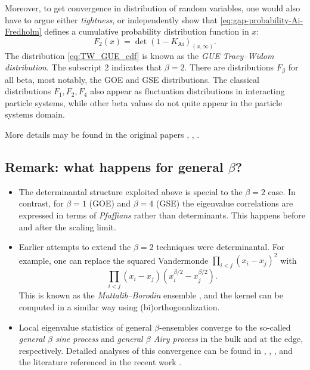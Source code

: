\documentclass[letterpaper,11pt,oneside,reqno]{article}
\numberwithin{equation}{section}
\theoremstyle{definition}
\begin{document}
Moreover, to get convergence in distribution of random variables,
one would also have to argue either \emph{tightness},
or independently show that
\eqref{eq:gap-probability-Ai-Fredholm} defines a
cumulative probability
distribution function in $x$:
\begin{equation}
	\label{eq:TW_GUE_cdf}
	F_2(x)=\det\left( 1-K_{\mathrm{Ai}} \right)_{(x,\infty)}.
\end{equation}
The distribution \eqref{eq:TW_GUE_cdf} is known as the \emph{GUE Tracy--Widom distribution}.
The subscript $2$ indicates that $\beta=2$. There are distributions
$F_\beta$ for all beta, most notably, the GOE and GSE distributions.
The classical distributions $F_1,F_2,F_4$ also appear as fluctuation distributions
in interacting particle systems, while other beta values do
not quite appear in the particle systems
domain.

More details
may be found in the original papers
\cite{tracy1993level},
\cite{Forrester1993},
\cite{tracy_widom1994level_airy}.



\subsection{Remark: what happens for general $\beta$?}

\begin{itemize}
    \item The determinantal structure exploited above is special to the $\beta=2$ case. In contrast, for $\beta=1$ (GOE) and $\beta=4$ (GSE) the eigenvalue correlations are expressed in terms of \emph{Pfaffians} rather than determinants.
			This happens before and after the scaling limit.
		\item
			Earlier attempts to extend the $\beta=2$ techniques
			were determinantal. For example, one can replace the
			squared Vandermonde $\prod_{i<j} (x_i-x_j)^2$ with
			\begin{equation*}
			 \prod_{i<j} (x_i-x_j)(x_i^{\beta/2}-x_j^{\beta/2}).
			\end{equation*}
			This is known as the \emph{Muttalib--Borodin} ensemble
			\cite{forrester2017},
			and the kernel can be computed in a similar way using (bi)orthogonalization.
		\item Local eigenvalue statistics of general $\beta$-ensembles converge to the so-called
			\emph{general $\beta$ sine process}
			and
			\emph{general $\beta$ Airy process}
			in the bulk and at the edge, respectively.
			Detailed analyses of this convergence can be found in
			\cite{RamirezRiderVirag2006RandomAiry},
			\cite{valko2009continuum},
			\cite{gorin2018stochastic},
			and the literature referenced in the recent work
			\cite{gorin2024airy}.
\end{itemize}
\end{document}
